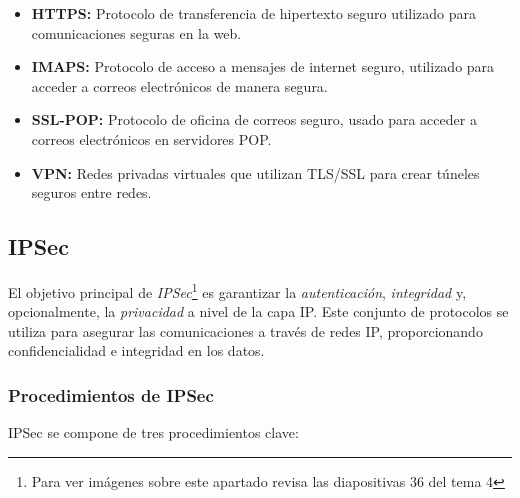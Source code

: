 \documentclass[a4paper,12pt]{article}
\begin{document}
\begin{itemize}
    \item \textbf{HTTPS:} Protocolo de transferencia de hipertexto seguro utilizado para comunicaciones seguras en la web.
    \item \textbf{IMAPS:} Protocolo de acceso a mensajes de internet seguro, utilizado para acceder a correos electrónicos de manera segura.
    \item \textbf{SSL-POP:} Protocolo de oficina de correos seguro, usado para acceder a correos electrónicos en servidores POP.
    \item \textbf{VPN:} Redes privadas virtuales que utilizan TLS/SSL para crear túneles seguros entre redes.
\end{itemize}




\subsection{IPSec}

El objetivo principal de \textit{IPSec}\footnote{Para ver imágenes sobre este apartado revisa las diapositivas 36 del tema 4} es garantizar la \textit{autenticación}, \textit{integridad} y, opcionalmente, la \textit{privacidad} a nivel de la capa IP. Este conjunto de protocolos se utiliza para asegurar las comunicaciones a través de redes IP, proporcionando confidencialidad e integridad en los datos.

\subsubsection{Procedimientos de IPSec}

IPSec se compone de tres procedimientos clave:
\end{document}
